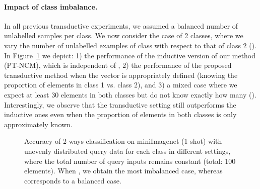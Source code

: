 \documentclass[twoside]{article}
\begin{document}
\paragraph{Impact of class imbalance.} In all previous transductive experiments, we assumed a balanced number of unlabelled samples per class. We now consider the case of 2 classes, where we vary the number of unlabelled examples  of class  with respect to that of class 2 (). In Figure~\ref{fig:imbalanced} we depict: 1) the performance of the inductive version of our method (PT-NCM), which is independent of , 2) the performance of the proposed transductive method when the vector  is appropriately defined (knowing the proportion of elements in class 1 vs. class 2), and 3) a mixed case where we expect at least 30 elements in both classes but do not know exactly how many (). Interestingly, we observe that the transductive setting still outperforms the inductive ones even when the proportion of elements in both classes is only approximately known.

\begin{figure}[h]
  \begin{center}
  \end{center}
  \vspace{-.5cm}
  \caption{Accuracy of 2-ways classification on miniImagenet (1-shot) with unevenly distributed query data for each class in different settings, where the total number of query inputs remains constant (total: 100 elements). When , we obtain the most imbalanced case, whereas  corresponds to a balanced case. }
  \label{fig:imbalanced}
\end{figure}
\end{document}
